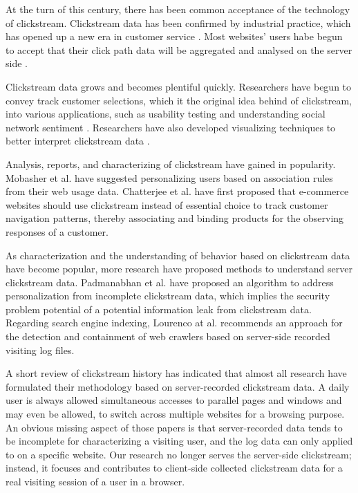At the turn of this century, there has been common acceptance of the technology of clickstream.
Clickstream data has been confirmed by industrial practice, which has opened up a new era in 
customer service \cite{walsh2000internet}. Most websites' users habe begun to accept that 
their click path data will be aggregated and analysed on the server side \cite{carr2000hypermediation}.

Clickstream data grows and becomes plentiful quickly. Researchers have begun to convey 
track customer selections, which it the original idea behind of clickstream,
into various applications, such as usability testing \cite{Waterson:2002:LOW:506443.506602}
and understanding social network sentiment \cite{Schneider:2009:UOS:1644893.1644899}.
Researchers have also developed visualizing
techniques to better interpret clickstream data \cite{Waterson:2002:DTU:1556262.1556276}.

Analysis, reports, and characterizing of clickstream have gained in popularity. 
Mobasher et al. \cite{Mobasher:2001:EPB:502932.502935}
have suggested personalizing users based on association rules from their web usage data. 
Chatterjee et al. \cite{chatterjee2003modeling} 
have first proposed that e-commerce websites should use clickstream instead of essential choice 
to track customer navigation patterns, thereby 
associating and binding products for the observing responses of a customer.

As characterization and the understanding of behavior based on clickstream data have become popular, 
more research have proposed methods to understand server clickstream data.
Padmanabhan et al. \cite{Padmanabhan:2001:PID:502512.502535} have
proposed an algorithm to address personalization from incomplete clickstream data, which implies
the security problem potential of a potential information leak from clickstream data. 
Regarding search engine indexing, Lourenco at al. \cite{Lourenco:2006:CWC:1145581.1145634} recommends an approach for
the detection and containment of web crawlers based on server-side recorded visiting log files.

A short review of clickstream history has indicated that almost all research have formulated their 
methodology based on server-recorded clickstream data.
A daily user is always allowed simultaneous accesses to parallel pages and windows and may even be allowed,
to switch across multiple websites for a browsing purpose.
An obvious missing aspect of those papers is that server-recorded data tends to be incomplete for 
characterizing a visiting user, and the log data can only applied to on a specific website. 
Our research no longer serves the server-side clickstream; instead, it
focuses and contributes to client-side collected clickstream data 
for a real visiting session of a user in a browser.

